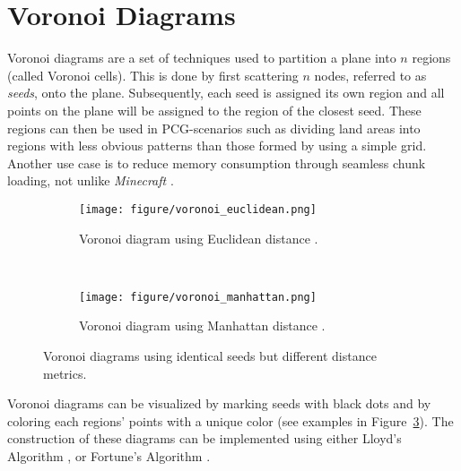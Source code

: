 \section{Voronoi Diagrams}

Voronoi diagrams are a set of techniques used to partition a plane into $n$ regions (called Voronoi cells).
This is done by first scattering $n$ nodes, referred to as \textit{seeds}, onto the plane.
Subsequently, each seed is assigned its own region and all points on the plane will be assigned to the region of the closest seed.
These regions can then be used in PCG-scenarios such as dividing land areas into regions with less obvious patterns than those formed by using a simple grid.
Another use case is to reduce memory consumption through seamless chunk loading, not unlike \textit{Minecraft} \cite{minecraft}.

\begin{figure}[H]
  \centering
  \begin{subfigure}[b]{0.4\textwidth}
    \texttt{[image: figure/voronoi\_euclidean.png]}
    \caption{Voronoi diagram using Euclidean distance \cite{voronoi_euclidean}.}
    \label{fig:voronoi_euclidean}
  \end{subfigure}
  ~
  \begin{subfigure}[b]{0.4\textwidth}
    \texttt{[image: figure/voronoi\_manhattan.png]}
    \caption{Voronoi diagram using Manhattan distance \cite{voronoi_manhattan}.}
    \label{fig:voronoi_manhattan}
  \end{subfigure}
  \caption{Voronoi diagrams using identical seeds but different distance metrics.}
  \label{fig:voronoi}
\end{figure}
\vspace{-0.5cm} %

Voronoi diagrams can be visualized by marking seeds with black dots and by coloring each regions' points with a unique color (see examples in Figure~\ref{fig:voronoi}).
The construction of these diagrams can be implemented using either Lloyd's Algorithm \cite{voronoi_lloyd}, or Fortune's Algorithm \cite{voronoi_fortune}. 
